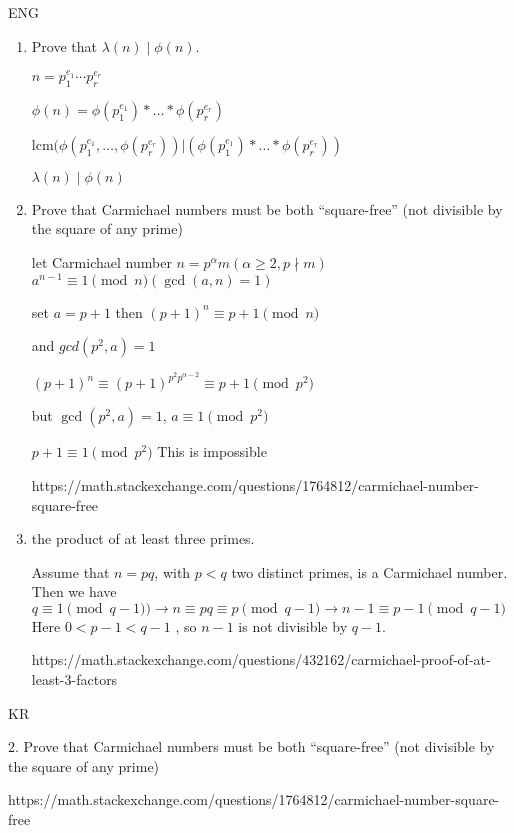 ENG

\begin{enumerate}
    \item  Prove that $\lambda(n) \mid \phi(n)$.
    
    $n = p_1^{e_1} \cdots p_r^{e_r}$

    $ \phi(n) = \phi(p_1^{e_1})* \ldots*\phi(p_r^{e_r})$

    $\text{lcm}(\phi(p_1^{e_1}, \ldots, \phi(p_r^{e_r})) | (\phi(p_1^{e_1})* \ldots*\phi(p_r^{e_r}))$
    
    $\lambda(n) \mid \phi(n)$

    \item  Prove that Carmichael numbers must be both “square-free” (not divisible by the square of any prime) 

    let Carmichael number $n = p^\alpha m( \alpha \ge 2 ,  p \nmid m )$
    $a^{n-1} \equiv 1 \pmod{n} (\gcd(a,n) = 1)$
    
    set $a = p+1 $ then $(p+1)^{n} \equiv p+1 \pmod{n}$
    
    and $gcd(p^2,a) = 1$
    
    $(p+1)^{n} \equiv (p+1)^{p^2 p^{\alpha-2}} \equiv p+1 \pmod{p^2}$
    
    but $\gcd(p^2,a) = 1$,  $ a \equiv 1 \pmod{p^2}$
    
    $p+1 \equiv 1 \pmod{p^2}$ This is impossible
    
    https://math.stackexchange.com/questions/1764812/carmichael-number-square-free


    
    \item  the product of at least three primes. 
    
    Assume that $n=pq$, with $p<q$ two distinct primes, is a Carmichael number. 
    Then we have 
    $q≡1 \pmod{q−1} )\rightarrow n \equiv pq \equiv p \pmod{q−1}  \rightarrow n−1 \equiv p−1 \pmod{q−1}$
    Here $0 < p−1 < q−1$ , so $n−1$ is not divisible by $q−1$.

    
    https://math.stackexchange.com/questions/432162/carmichael-proof-of-at-least-3-factors

\end{enumerate}



KR

2. Prove that Carmichael numbers must be both “square-free” (not divisible by the square of any prime) 

https://math.stackexchange.com/questions/1764812/carmichael-number-square-free


